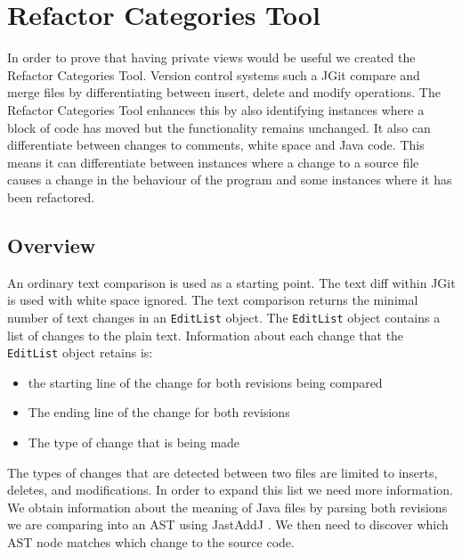 
\chapter{Refactor Categories Tool}
In order to prove that having private views would be useful we created the Refactor Categories Tool. Version control systems such a JGit compare and merge files by differentiating between insert, delete and modify operations. The Refactor Categories Tool enhances this by also identifying instances where a block of code has moved but the functionality remains unchanged. It also can differentiate between changes to comments, white space and Java code. This means it can differentiate between instances where a change to a source file causes a change in the behaviour of the program and some instances where it has been refactored.  



\section{Overview}
An ordinary text comparison is used as a starting point.  The text diff within JGit is used with white space ignored. The text comparison returns the minimal number of text changes in an \lstinline{EditList} object. The \lstinline{EditList} object contains a list of changes to the plain text. Information about each change that the \lstinline{EditList} object retains is:

\begin{itemize}
  \item the starting line of the change for both revisions being compared
  \item The ending line of the change for both revisions 
  \item The type of change that is being made
\end{itemize}

The types of changes that are detected between two files are limited to inserts, deletes, and modifications. In order to expand this list we need more information.  We obtain information about the meaning of Java files by parsing both revisions we are comparing into an AST using JastAddJ \cite{Oqvist2013}. We then need to discover which AST node matches which change to the source code. 

